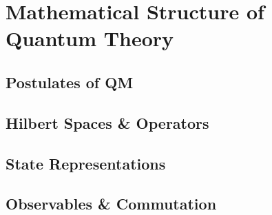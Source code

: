 \chapter{Mathematical Structure of Quantum Theory}

\section{Postulates of QM}

\section{Hilbert Spaces \& Operators}

\section{State Representations}

\section{Observables \& Commutation}
